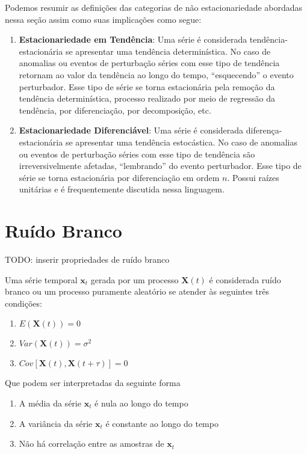 Podemos resumir as definições das categorias de não estacionariedade abordadas
nessa seção assim como suas implicações como segue:

\begin{enumerate}
    \item \textbf{Estacionariedade em Tendência}: Uma série é considerada
        tendência-estacionária se apresentar uma tendência determinística. No
        caso de anomalias ou eventos de perturbação séries com esse tipo de
        tendência retornam ao valor da tendência ao longo do tempo,
        ``esquecendo'' o evento perturbador. Esse tipo de série se torna
        estacionária pela remoção da tendência determinística, processo
        realizado por meio de regressão da tendência, por diferenciação, por
        decomposição, etc.
    \item \textbf{Estacionariedade Diferenciável}: Uma série é considerada
        diferença-estacionária se apresentar uma tendência estocástica. No
        caso de anomalias ou eventos de perturbação séries com esse tipo de
        tendência são irreversivelmente afetadas,
        ``lembrando'' do evento perturbador. Esse tipo de série se torna
        estacionária por diferenciação em ordem $n$. Possui raízes unitárias
        e é frequentemente discutida nessa linguagem.

\end{enumerate}

\section{Ruído Branco}\label{sec:white_noise}

TODO: inserir propriedades de ruído branco

Uma série temporal $\mathbf{x}_t$ gerada por um processo $\mathbf{X}(t)$ é
considerada ruído branco ou um processo puramente aleatório se atender às
seguintes três condições:

\begin{enumerate}
    \item $E(\mathbf{X}(t)) = 0$
    \item $Var(\mathbf{X}(t)) = \sigma^2$
    \item $Cov[\mathbf{X}(t), \mathbf{X}(t+\tau)] = 0$
\end{enumerate}\vspace{.5cm}

Que podem ser interpretadas da seguinte forma

\begin{enumerate}
    \item A média da série $\mathbf{x}_t$ é nula ao longo do tempo
    \item A variância da série $\mathbf{x}_t$ é constante ao longo do tempo
    \item Não há correlação entre as amostras de $\mathbf{x}_t$
\end{enumerate}\vspace{.5cm}

